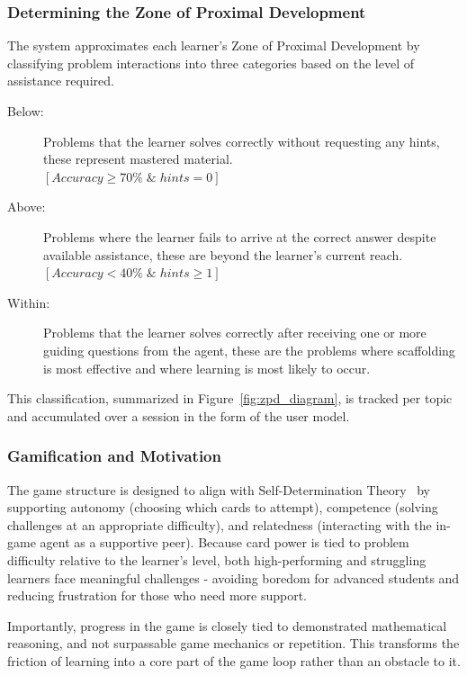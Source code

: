 

\subsubsection{Determining the Zone of Proximal Development}

The system approximates each learner's Zone of Proximal Development by classifying problem interactions into three categories based on the level of assistance required.

\begin{description}

    \item [Below:] Problems that the learner solves correctly without requesting any hints, these represent mastered material.\\$\left[Accuracy \geq 70\% \; \& \; hints = 0\right]$

    \item [Above:] Problems where the learner fails to arrive at the correct answer despite available assistance, these are beyond the learner's current reach.\\$\left[Accuracy < 40\% \; \& \; hints \geq 1\right]$

    \item [Within:] Problems that the learner solves correctly after receiving one or more guiding questions from the agent, these are the problems where scaffolding is most effective and where learning is most likely to occur.

\end{description}

This classification, summarized in Figure~\ref{fig:zpd_diagram}, is tracked per topic and accumulated over a session in the form of the user model.



\subsubsection{Gamification and Motivation}

The game structure is designed to align with Self-Determination Theory~\cite{ryan2000self} by supporting autonomy (choosing which cards to attempt), competence (solving challenges at an appropriate difficulty), and relatedness (interacting with the in-game agent as a supportive peer). Because card power is tied to problem difficulty relative to the learner's level, both high-performing and struggling learners face meaningful challenges - avoiding boredom for advanced students and reducing frustration for those who need more support.

Importantly, progress in the game is closely tied to demonstrated mathematical reasoning, and not surpassable game mechanics or repetition. This transforms the friction of learning into a core part of the game loop rather than an obstacle to it.
